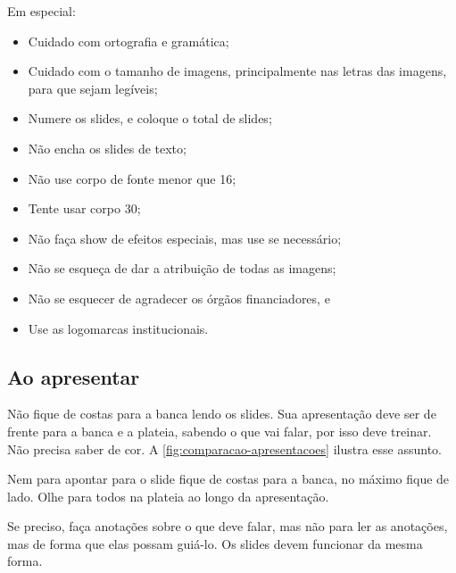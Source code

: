 Em especial:
\begin{itemize}
    \item Cuidado com ortografia e gramática;
    \item Cuidado com o tamanho de imagens, principalmente nas letras das imagens, para que sejam legíveis;
    \item Numere os slides, e coloque o total de slides;
    \item Não encha os slides de texto;
    \item Não use corpo de fonte menor que 16;
    \item Tente usar corpo 30;
    \item Não faça show de efeitos especiais, mas use se necessário;
    \item Não se esqueça de dar a atribuição de todas as imagens;
    \item Não se esquecer de agradecer os órgãos financiadores, e
    \item Use as logomarcas institucionais.
\end{itemize}

\subsection{Ao apresentar}

Não fique de costas para a banca lendo os slides. Sua apresentação deve ser de frente para a banca e a plateia, sabendo o que vai falar, por isso deve treinar. Não precisa saber de cor. A \autoref{fig:comparacao-apresentacoes} ilustra esse assunto. 

Nem para apontar para o slide fique de costas para a banca, no máximo fique de lado. Olhe para todos na plateia ao longo da apresentação.

Se preciso, faça anotações sobre o que deve falar, mas não para ler as anotações, mas de forma que elas possam guiá-lo. Os slides devem funcionar da mesma forma.


